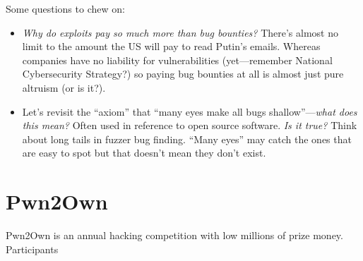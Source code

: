 \documentclass[11pt]{article}
\begin{document}
Some questions to chew on:
\begin{itemize}
    \item {\it Why do exploits pay so much more than bug bounties?} There's almost no limit to the amount the US will pay to read Putin's emails. Whereas companies have no liability for vulnerabilities (yet---remember National Cybersecurity Strategy?) so paying bug bounties at all is almost just pure altruism (or is it?).
    \item Let's revisit the ``axiom'' that ``many eyes make all bugs shallow''---{\it what does this mean?} Often used in reference to open source software. {\it Is it true?} Think about long tails in fuzzer bug finding. ``Many eyes'' may catch the ones that are easy to spot but that doesn't mean they don't exist. 
\end{itemize}


\section{Pwn2Own}

Pwn2Own is an annual hacking competition with low millions of prize money. Participants
\end{document}
